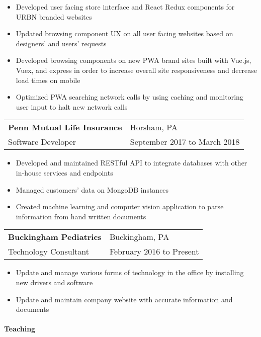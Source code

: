 \documentclass[9pt,]{article}
\let\oldparagraph\paragraph
\renewcommand{\paragraph}[1]{\oldparagraph{#1}\mbox{}}
\begin{document}
\begin{itemize}
	\setlength\itemsep{-0.75em}
    \item Developed user facing store interface and React Redux components for URBN branded websites
    \item Updated browsing component UX on all user facing websites based on designers' and users' requests
    \item Developed browsing components on new PWA brand sites built with Vue.js, Vuex, and express in order to increase overall site responsiveness and decrease load times on mobile
    \item Optimized PWA searching network calls by using caching and monitoring user input to halt new network calls
\end{itemize}

\begin{tabularx}{\textwidth}{l X}
    \textbf{Penn Mutual Life Insurance} & \hfill Horsham, PA\\
    Software Developer          & \hfill September 2017 to March 2018
\end{tabularx}

\begin{itemize}
	\setlength\itemsep{-0.75em}
    \item Developed and maintained RESTful API to integrate databases with other in-house services and endpoints
    \item Managed customers' data on MongoDB instances
    \item Created machine learning and computer vision application to parse information from hand written documents
\end{itemize}

\begin{tabularx}{\textwidth}{l X}
    \textbf{Buckingham Pediatrics} & \hfill Buckingham, PA\\
    Technology Consultant          & \hfill February 2016 to Present
\end{tabularx}

\begin{itemize}
	\setlength\itemsep{-0.75em}
    \item Update and manage various forms of technology in the office by installing new drivers and software
    \item Update and maintain company website with accurate information and documents
\end{itemize}

\paragraph{Teaching}
\end{document}
